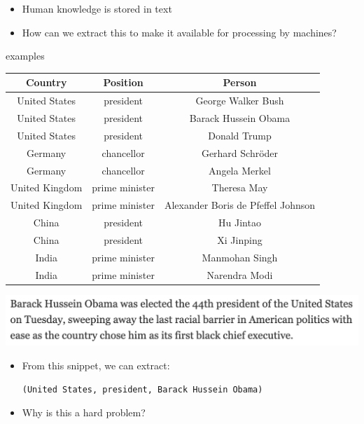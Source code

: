 \documentclass[landscape]{jhuslides3C}
\begin{document}
\begin{itemize}\itemsep 0mm
\item Human knowledge is stored in text
\item How can we extract this to make it available for processing by machines?
\end{itemize}
\vfill


\slide{}
\vspace{85mm}
\begin{center}
{\huge examples}
\end{center}


\vfill
\begin{tabular}{|c|c|c|}\hline
\bf Country & \bf Position & \bf Person\\ \hline \hline
United States & president & George Walker Bush \\ \hline
United States & president & Barack Hussein Obama \\ \hline
United States & president & Donald Trump\\ \hline
Germany & chancellor & Gerhard Schr\"oder \\ \hline
Germany & chancellor & Angela Merkel \\ \hline
United Kingdom & prime minister & Theresa May \\ \hline
United Kingdom & prime minister & Alexander Boris de Pfeffel Johnson \\ \hline
China & president & Hu Jintao \\ \hline
China & president & Xi Jinping \\ \hline
India & prime minister & Manmohan Singh \\ \hline
India & prime minister & Narendra Modi \\ \hline
\end{tabular}
\vfill


\vfill
\begin{center}
\includegraphics[scale=1.2]{obama-elected.png}
\end{center}
\vfill
\begin{itemize}
\item From this snippet, we can extract:
\begin{center}
\tt (United States, president, Barack Hussein Obama)
\end{center}
\item Why is this a hard problem?
\end{itemize}
\vfill
\end{document}
